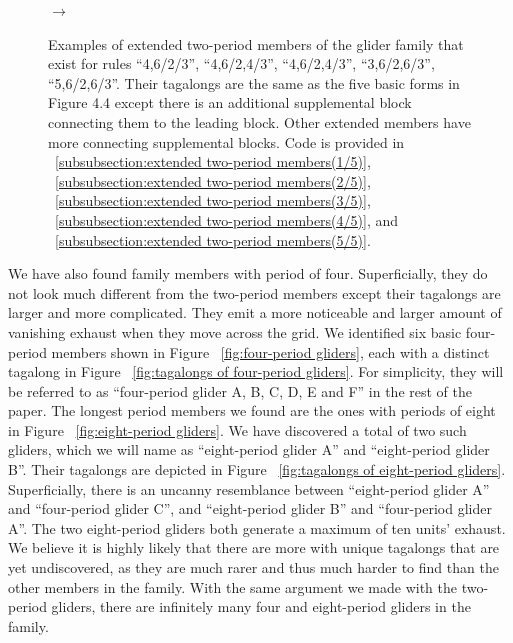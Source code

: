 \documentclass[12pt]{article}
\numberwithin{figure}{section} %
\begin{document}
\begin{figure}[H]
\begin{subfigure}{0.3\textwidth}
     \subcaption{}
   \end{subfigure}
      {\LARGE$\xrightarrow{}$}
   \setcounter{subfigure}{0}
   \caption{Examples of extended two-period members of the glider family that exist for rules “4,6/2/3”, “4,6/2,4/3”, “4,6/2,4/3”, “3,6/2,6/3”, “5,6/2,6/3”. Their tagalongs are the same as the five basic forms in Figure 4.4 except there is an additional supplemental block connecting them to the leading block. Other extended members have more connecting supplemental blocks. Code is provided in ~\ref{subsubsection:extended two-period members(1/5)}, ~\ref{subsubsection:extended two-period members(2/5)}, ~\ref{subsubsection:extended two-period members(3/5)}, ~\ref{subsubsection:extended two-period members(4/5)}, and ~\ref{subsubsection:extended two-period members(5/5)}. }
   \label{fig:extended two-period members}
   \vspace{-1.5em}
\end{figure}

We have also found family members with period of four. Superficially, they do not look much different from the two-period members except their tagalongs are larger and more complicated. They emit a more noticeable and larger amount of vanishing exhaust when they move across the grid. We identified six basic four-period members shown in Figure ~\ref{fig:four-period gliders}, each with a distinct tagalong in Figure ~\ref{fig:tagalongs of four-period gliders}. For simplicity, they will be referred to as “four-period glider A, B, C, D, E and F” in the rest of the paper. The longest period members we found are the ones with periods of eight in Figure ~\ref{fig:eight-period gliders}. We have discovered a total of two such gliders, which we will name as “eight-period glider A” and “eight-period glider B”. Their tagalongs are depicted in Figure ~\ref{fig:tagalongs of eight-period gliders}. Superficially, there is an uncanny resemblance between “eight-period glider A” and “four-period glider C”, and “eight-period glider B” and “four-period glider A”. The two eight-period gliders both generate a maximum of ten units’ exhaust. We believe it is highly likely that there are more with unique tagalongs that are yet undiscovered, as they are much rarer and thus much harder to find than the other members in the family. With the same argument we made with the two-period gliders, there are infinitely many four and eight-period gliders in the family. 
\end{document}
